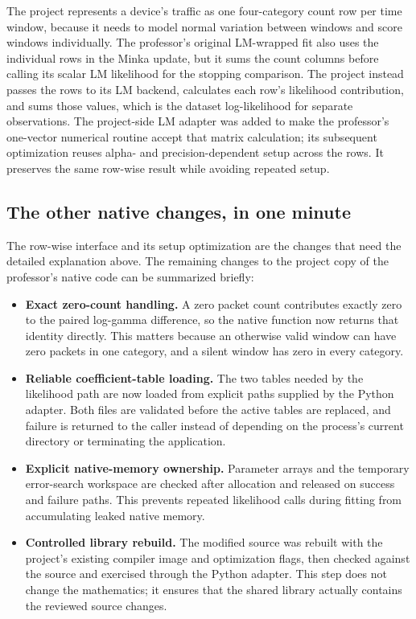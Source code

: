\documentclass[11pt]{article}
\begin{document}
The project represents a device's traffic as one four-category count row per
time window, because it needs to model normal variation between windows and
score windows individually. The professor's original LM-wrapped fit also uses
the individual rows in the Minka update, but it sums the count columns before
calling its scalar LM likelihood for the stopping comparison. The project
instead passes the rows to its LM backend, calculates each row's likelihood
contribution, and sums those values, which is the dataset log-likelihood for
separate observations. The project-side LM adapter was added to make the
professor's one-vector numerical routine accept that matrix calculation; its
subsequent optimization reuses alpha- and precision-dependent setup across the
rows. It preserves the same row-wise result while avoiding repeated setup.

\subsection{The other native changes, in one minute}

The row-wise interface and its setup optimization are the changes that need
the detailed explanation above. The remaining changes to the project copy of
the professor's native code can be summarized briefly:

\begin{itemize}

\item \textbf{Exact zero-count handling.} A zero packet count contributes
exactly zero to the paired log-gamma difference, so the native function now
returns that identity directly. This matters because an otherwise valid
window can have zero packets in one category, and a silent window has zero in
every category.

\item \textbf{Reliable coefficient-table loading.} The two tables needed by
the likelihood path are now loaded from explicit paths supplied by the Python
adapter. Both files are validated before the active tables are replaced, and
failure is returned to the caller instead of depending on the process's
current directory or terminating the application.

\item \textbf{Explicit native-memory ownership.} Parameter arrays and the
temporary error-search workspace are checked after allocation and released on
success and failure paths. This prevents repeated likelihood calls during
fitting from accumulating leaked native memory.

\item \textbf{Controlled library rebuild.} The modified source was rebuilt
with the project's existing compiler image and optimization flags, then
checked against the source and exercised through the Python adapter. This step
does not change the mathematics; it ensures that the shared library actually
contains the reviewed source changes.

\end{itemize}
\end{document}
